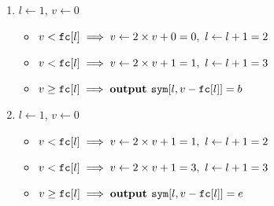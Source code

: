 \begin{enumerate}
\begin{enumerate}
    \item $l \gets 1$, $v \gets 0$
    \begin{itemize}
      \item $v < \text{\tt fc}[l] \implies v \gets 2 \times v + 0 = 0,\ l \gets l + 1 = 2$
      \item $v < \text{\tt fc}[l] \implies v \gets 2 \times v + 1 = 1,\ l \gets l + 1 = 3$
      \item $v \ge \text{\tt fc}[l] \implies \text{\bf output \tt sym}[l, v - \text{\tt fc}[l]] = b$
    \end{itemize}

    \item $l \gets 1$, $v \gets 0$
    \begin{itemize}
      \item $v < \text{\tt fc}[l] \implies v \gets 2 \times v + 1 = 1,\ l \gets l + 1 = 2$
      \item $v < \text{\tt fc}[l] \implies v \gets 2 \times v + 1 = 3,\ l \gets l + 1 = 3$
      \item $v \ge \text{\tt fc}[l] \implies \text{\bf output \tt sym}[l, v - \text{\tt fc}[l]] = e$
    \end{itemize}
  \end{enumerate}

\end{enumerate}
